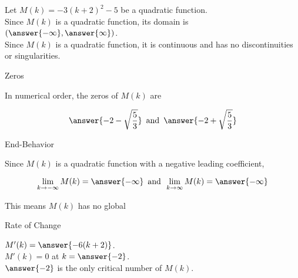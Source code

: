 \documentclass{ximera}
\author{Lee Wayand}
\begin{document}
\begin{exercise} 









Let $M(k) = -3(k+2)^2 - 5$ be a quadratic function. \\




Since $M(k)$ is a quadratic function, its domain is $\left( \answer{-\infty}, \answer{\infty} \right)$. \\


Since $M(k)$ is a quadratic function, it is continuous and has no discontinuities or singularities. \\





\begin{question} Zeros



In numerical order, the zeros of $M(k)$ are

\[
\answer{-2 - \sqrt{\frac{5}{3}}} \, \text{ and } \, \answer{-2 + \sqrt{\frac{5}{3}}}
\]

\end{question}






\begin{question} End-Behavior



Since $M(k)$ is a quadratic function with a negative leading coefficient,

\[
\lim\limits_{k \to -\infty}M(k) = \answer{-\infty} \, \text{ and } \, \lim\limits_{k \to \infty}M(k) = \answer{-\infty}
\]


This means $M(k)$ has no global  

\end{question}




\begin{question}   Rate of Change



$M'(k) = \answer{-6(k+2)}$. \\



$M'(k) = 0$  at  $k = \answer{-2}$. \\


$\answer{-2}$ is the only critical number of $M(k)$. \\



\end{question}
\end{exercise}
\end{document}
